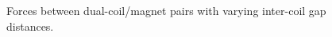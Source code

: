 \begin{figure}
  \begin{subfigure}
  \end{subfigure}\par
  \begin{subfigure}
  \end{subfigure}
  \caption{Forces between dual-coil/magnet pairs with varying
    inter-coil gap distances. }
\end{figure}



